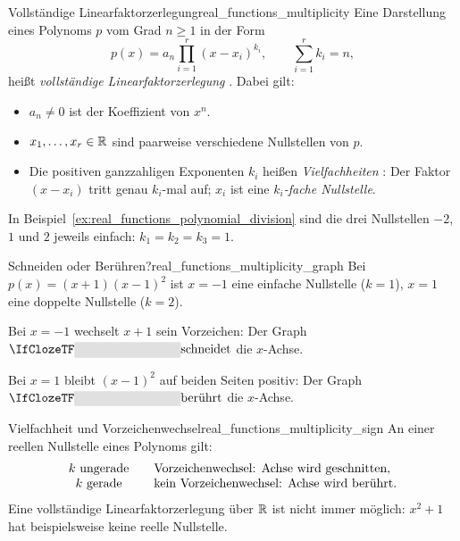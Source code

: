 \par\noindent\begin{minipage}{\linewidth}
\begin{DefinitionBox}{Vollständige Linearfaktorzerlegung}{real_functions_multiplicity}
  Eine Darstellung eines Polynoms $p$ vom Grad $n\ge1$ in der Form
  \[
    p(x)=a_n\prod_{i=1}^{r}(x-x_i)^{k_i},
    \qquad \sum_{i=1}^{r}k_i=n,
  \]
  heißt \emph{vollständige Linearfaktorzerlegung}
  . Dabei gilt:
  \begin{itemize}[nosep,leftmargin=*]
    \item $a_n\ne0$ ist der Koeffizient von $x^n$.
    \item $x_1,\ldots,x_r\in\mathbb{R}$ sind paarweise verschiedene Nullstellen von $p$.
    \item Die positiven ganzzahligen Exponenten $k_i$ heißen
      \emph{Vielfachheiten} :
      Der Faktor $(x-x_i)$ tritt genau $k_i$-mal auf;
      $x_i$ ist eine \emph{$k_i$-fache Nullstelle}.
  \end{itemize}
\end{DefinitionBox}
In Beispiel~\ref{ex:real_functions_polynomial_division} sind die drei Nullstellen
$-2$, $1$ und $2$ jeweils einfach: $k_1=k_2=k_3=1$.
\par\smallskip
\begin{ExampleBox}[before skip=0.3\baselineskip]{Schneiden oder Berühren?}{real_functions_multiplicity_graph}
  Bei $p(x)=(x+1)(x-1)^2$ ist $x=-1$ eine einfache Nullstelle ($k=1$),
  $x=1$ eine doppelte Nullstelle ($k=2$).
  \par\smallskip
  \begin{minipage}[c]{0.46\linewidth}
    Bei $x=-1$ wechselt $x+1$ sein Vorzeichen: Der Graph
    $\Cloze{3cm}{\text{schneidet}}$ die $x$-Achse.

    Bei $x=1$ bleibt $(x-1)^2$ auf beiden Seiten positiv: Der Graph
    $\Cloze{3cm}{\text{berührt}}$ die $x$-Achse.
  \end{minipage}\hfill
  \begin{minipage}[c]{0.50\linewidth}
    \centering
  \end{minipage}
\end{ExampleBox}
\end{minipage}

\begin{KeyPointBox}{Vielfachheit und Vorzeichenwechsel}{real_functions_multiplicity_sign}
  An einer reellen Nullstelle eines Polynoms gilt:
  \[
    \begin{array}{c@{\qquad}l}
      k\text{ ungerade}&\text{Vorzeichenwechsel: Achse wird geschnitten},\\
      k\text{ gerade}&\text{kein Vorzeichenwechsel: Achse wird berührt}.
    \end{array}
  \]
  Eine vollständige Linearfaktorzerlegung über $\mathbb{R}$ ist nicht immer möglich:
  $x^2+1$ hat beispielsweise keine reelle Nullstelle.
\end{KeyPointBox}
